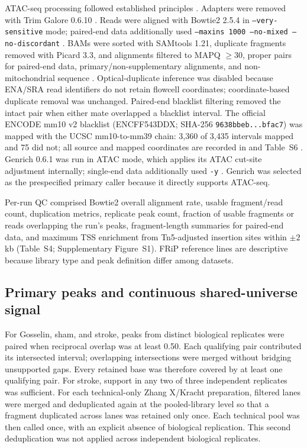 \documentclass[11pt]{article}
\begin{document}
ATAC-seq processing followed established principles \citep{buenrostro2013atacseq,corces2017omni}. Adapters were removed with Trim Galore 0.6.10 \citep{krueger2015trimgalore}. Reads were aligned with Bowtie2 2.5.4 in \texttt{--very-sensitive} mode; paired-end data additionally used \texttt{--maxins 1000 --no-mixed --no-discordant} \citep{langmead2012bowtie2}. BAMs were sorted with SAMtools 1.21, duplicate fragments removed with Picard 3.3, and alignments filtered to MAPQ $\geq30$, proper pairs for paired-end data, primary/non-supplementary alignments, and non-mitochondrial sequence \citep{li2009samtools,quinlan2010bedtools}. Optical-duplicate inference was disabled because ENA/SRA read identifiers do not retain flowcell coordinates; coordinate-based duplicate removal was unchanged. Paired-end blacklist filtering removed the intact pair when either mate overlapped a blacklist interval. The official ENCODE mm10 v2 blacklist (ENCFF543DDX; SHA-256 \texttt{9638bbeb...bfac7}) was mapped with the UCSC mm10-to-mm39 chain: 3,360 of 3,435 intervals mapped and 75 did not; all source and mapped coordinates are recorded in  and Table~S6 \citep{amemiya2019encode}. Genrich 0.6.1 was run in ATAC mode, which applies its ATAC cut-site adjustment internally; single-end data additionally used \texttt{-y} \citep{genrich2019}. Genrich was selected as the prespecified primary caller because it directly supports ATAC-seq.

Per-run QC comprised Bowtie2 overall alignment rate, usable fragment/read count, duplication metrics, replicate peak count, fraction of usable fragments or reads overlapping the run's peaks, fragment-length summaries for paired-end data, and maximum TSS enrichment from Tn5-adjusted insertion sites within $\pm2$ kb (Table~S4; Supplementary Figure~S1). FRiP reference lines are descriptive because library type and peak definition differ among datasets.

\subsection{Primary peaks and continuous shared-universe signal}

For Gosselin, sham, and stroke, peaks from distinct biological replicates were paired when reciprocal overlap was at least 0.50. Each qualifying pair contributed its intersected interval; overlapping intersections were merged without bridging unsupported gaps. Every retained base was therefore covered by at least one qualifying pair. For stroke, support in any two of three independent replicates was sufficient. For each technical-only Zhang X/Kracht preparation, filtered lanes were merged and deduplicated again at the pooled-library level so that a fragment duplicated across lanes was retained only once. Each technical pool was then called once, with an explicit absence of biological replication. This second deduplication was not applied across independent biological replicates.
\end{document}
